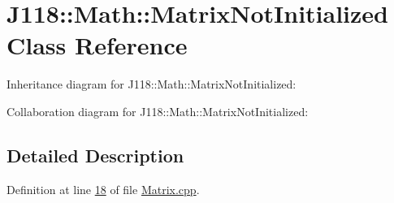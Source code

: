 \hypertarget{class_j118_1_1_math_1_1_matrix_not_initialized}{}\section{J118\+:\+:Math\+:\+:Matrix\+Not\+Initialized Class Reference}
\label{class_j118_1_1_math_1_1_matrix_not_initialized}


Inheritance diagram for J118\+:\+:Math\+:\+:Matrix\+Not\+Initialized\+:


Collaboration diagram for J118\+:\+:Math\+:\+:Matrix\+Not\+Initialized\+:


\subsection{Detailed Description}


Definition at line \hyperlink{_matrix_8cpp_source_l00018}{18} of file \hyperlink{_matrix_8cpp_source}{Matrix.\+cpp}.

